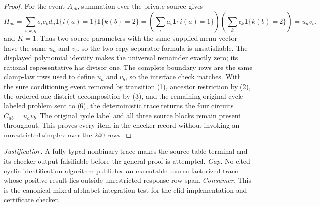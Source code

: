 \documentclass{article}
\begin{document}
\begin{proof}
For the event \(A_{ab}\), summation over the private source gives
\[
 H_{ab}=\sum_{i,k,\eta}a_ic_kd_\eta\mathbf 1\{i(a)=1\}\mathbf 1\{k(b)=2\}
 =\left(\sum_i a_i\mathbf 1\{i(a)=1\}\right)
  \left(\sum_k c_k\mathbf 1\{k(b)=2\}\right)=u_av_b,
\]
and \(K=1\).  Thus two source parameters with the same supplied menu vector have the same \(u_a\) and \(v_b\), so the two-copy separator formula is unsatisfiable.  The displayed polynomial identity makes the universal remainder exactly zero; its rational representative has divisor one.  The complete boundary rows are the same clamp-law rows used to define \(u_a\) and \(v_b\), so the interface check matches.  With the sure conditioning event removed by transition (1), ancestor restriction by (2), the ordered one-district decomposition by (3), and the remaining original-cycle-labeled problem sent to (6), the deterministic trace returns the four circuits \(C_{ab}=u_av_b\).  The original cycle label and all three source blocks remain present throughout.  This proves every item in the checker record without invoking an unrestricted simplex over the 240 rows.
\end{proof}
\par\smallskip\noindent \textit{Justification.} A fully typed nonbinary trace makes the source-table terminal and its checker output falsifiable before the general proof is attempted. \textit{Gap.} No cited cyclic identification algorithm publishes an executable source-factorized trace whose positive result lies outside unrestricted response-row span. \textit{Consumer.} This is the canonical mixed-alphabet integration test for the cfid implementation and certificate checker.
\end{document}

